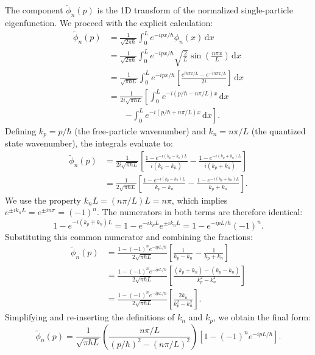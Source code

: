 The component $\tilde{\phi}_n(p)$ is the 1D transform of the
normalized single-particle eigenfunction.
We proceed with the explicit calculation:
\begin{align} \label{eq:1d_ft_setup}
  \tilde{\phi}_n(p) &= \frac{1}{\sqrt{2\pi\hbar}} \int_{0}^{L}
    e^{-ipx/\hbar} \phi_n(x) \,\mathrm{d}x \nonumber \\
    &= \frac{1}{\sqrt{2\pi\hbar}} \int_{0}^{L} e^{-ipx/\hbar}
    \sqrt{\frac{2}{L}} \sin\left(\frac{n\pi x}{L}\right)
    \,\mathrm{d}x \nonumber \\
    &= \frac{1}{\sqrt{\pi\hbar L}} \int_{0}^{L} e^{-ipx/\hbar}
    \left[ \frac{e^{i n\pi x/L} - e^{-i n\pi x/L}}{2i} \right]
    \,\mathrm{d}x \nonumber \\
    &= \frac{1}{2i\sqrt{\pi\hbar L}} \left[
    \int_{0}^{L} e^{-i(p/\hbar - n\pi/L)x} \,\mathrm{d}x \right. \nonumber \\
    & \qquad \left. - \int_{0}^{L} e^{-i(p/\hbar + n\pi/L)x} \,\mathrm{d}x
    \right].
\end{align}
Defining $k_p = p/\hbar$ (the free-particle wavenumber) and
$k_n = n\pi/L$ (the quantized state wavenumber), the integrals evaluate to:
\begin{align}
  \tilde{\phi}_n(p) &= \frac{1}{2i\sqrt{\pi\hbar L}} \left[
    \frac{1 - e^{-i(k_p - k_n)L}}{i(k_p - k_n)} -
    \frac{1 - e^{-i(k_p + k_n)L}}{i(k_p + k_n)} \right] \nonumber \\
    &= \frac{1}{2\sqrt{\pi\hbar L}} \left[
    \frac{1 - e^{-i(k_p - k_n)L}}{k_p - k_n} -
    \frac{1 - e^{-i(k_p + k_n)L}}{k_p + k_n} \right].
\end{align}
We use the property $k_n L = (n\pi/L)L = n\pi$, which implies
$e^{\pm i k_n L} = e^{\pm i n\pi} = (-1)^n$.
The numerators in both terms are therefore identical:
\begin{equation}
  1 - e^{-i(k_p \mp k_n)L} = 1 - e^{-ik_p L} e^{\pm i k_n L}
  = 1 - e^{-ipL/\hbar} (-1)^n.
\end{equation}
Substituting this common numerator and combining the fractions:
\begin{align}
  \tilde{\phi}_n(p) &= \frac{1 - (-1)^n e^{-ipL/\hbar}}{2\sqrt{\pi\hbar L}}
    \left[ \frac{1}{k_p - k_n} - \frac{1}{k_p + k_n} \right] \nonumber \\
    &= \frac{1 - (-1)^n e^{-ipL/\hbar}}{2\sqrt{\pi\hbar L}}
    \left[ \frac{(k_p + k_n) - (k_p - k_n)}{k_p^2 - k_n^2} \right] \nonumber \\
    &= \frac{1 - (-1)^n e^{-ipL/\hbar}}{2\sqrt{\pi\hbar L}}
    \left[ \frac{2k_n}{k_p^2 - k_n^2} \right].
\end{align}
Simplifying and re-inserting the definitions of $k_n$ and $k_p$,
we obtain the final form:
\begin{equation}
  \tilde{\phi}_n(p) = \frac{1}{\sqrt{\pi\hbar L}}
  \left( \frac{n\pi/L}{(p/\hbar)^2 - (n\pi/L)^2} \right)
  \left[ 1 - (-1)^n e^{-ipL/\hbar} \right].
  \label{eq:single_particle_momentum_wf}
\end{equation}
